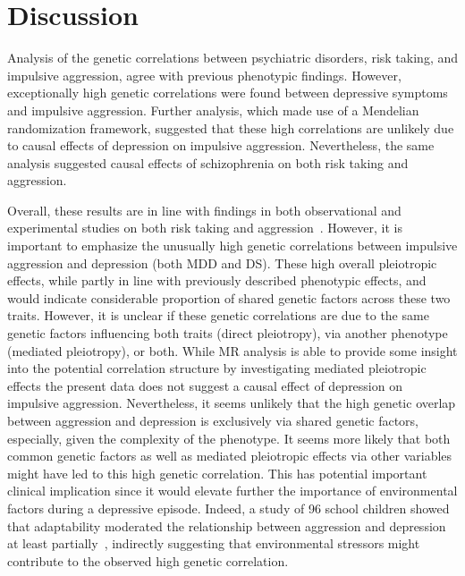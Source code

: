 \section{Discussion}
\label{sec:discussion_ukb_psych}

Analysis of the genetic correlations between psychiatric disorders, risk taking, and impulsive aggression, agree with previous phenotypic findings.
However, exceptionally high genetic correlations were found between depressive symptoms and impulsive aggression.
Further analysis, which made use of a Mendelian randomization framework, suggested that these high correlations are unlikely due to causal effects of depression on impulsive aggression.
Nevertheless, the same analysis suggested causal effects of schizophrenia on both risk taking and aggression. 

Overall, these results are in line with findings in both observational and experimental studies on both risk taking and aggression~\cite{Ballester2012,Ouzir2013,Hoptman2015,Sher2005,Roland2002,Taft2009, Dutton2013}.
However, it is important to emphasize the unusually high genetic correlations between impulsive aggression and depression (both MDD and DS).  
These high overall pleiotropic effects, while partly in line with previously described phenotypic effects, and would indicate considerable proportion of shared genetic factors across these two traits.
However, it is unclear if these genetic correlations are due to the same genetic factors influencing both traits (direct pleiotropy), via another phenotype (mediated pleiotropy), or both.
While MR analysis is able to provide some insight into the potential correlation structure by investigating mediated pleiotropic effects the present data does not suggest a causal effect of depression on impulsive aggression.
Nevertheless, it seems unlikely that the high genetic overlap between aggression and depression is exclusively via shared genetic factors,
especially, given the complexity of the phenotype.
It seems more likely that both common genetic factors as well as mediated pleiotropic effects via other variables might have led to this high genetic correlation.
This has potential important clinical implication since it would elevate further the importance of environmental factors during a depressive episode.
Indeed, a study of 96 school children showed that adaptability moderated the relationship between aggression and depression at least partially~\cite{Lee2015a}, indirectly suggesting that environmental stressors might contribute to the observed high genetic correlation. 

